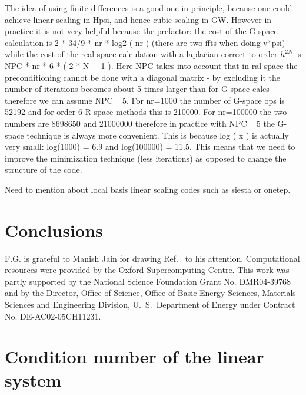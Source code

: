\documentclass[twocolumn,prb,showpacs,superscriptaddress]{revtex4}
\def\w{\omega}
\def\r{{\bf r}}
\def\rp{{\bf r^\prime}}
\begin{document}
The idea of using finite differences is a good one in principle,
because one could achieve linear scaling in Hpsi, and hence cubic scaling in GW.
However in practice it is not very helpful because the prefactor:
the cost of the G-space calculation is 2 * 34/9 * nr * log2 ( nr )   
(there are two ffts when doing v*psi) while the cost of the real-space 
calculation with a laplacian correct to order $h^{2N}$ is NPC * nr * 6 * ( 2 * N + 1 ).
Here NPC takes into account that in ral space the preconditioning
cannot be done with a diagonal matrix - by excluding it the number
of iterations becomes about 5 times larger than for G-space calcs -
therefore we can assume NPC ~ 5.
For nr=1000 the number of G-space ops is 52192 and for order-6 R-space methods
this is 210000. For nr=100000 the two numbers are 8698650 and 21000000
therefore in practice with NPC ~ 5 the G-space technique is always more convenient.
This is because log ( x ) is actually very small: log(1000) = 6.9 and log(100000) = 11.5.
This means that we need to improve the minimization technique (less iterations)
as opposed to change the structure of the code.

Need to mention about local basis linear scaling codes such as siesta or onetep.

\section{Conclusions}\label{sec.conclusions}



\begin{acknowledgments}
F.G. is grateful to Manish Jain for drawing Ref.\  to his attention.
Computational resources were provided by the Oxford Supercomputing Centre.
This work was partly supported by the National Science Foundation Grant No. DMR04-39768 and by
the Director, Office of Science, Office of Basic Energy Sciences, Materials Sciences
and Engineering Division, U.\ S.\ Department of Energy under Contract No. DE-AC02-05CH11231.
\end{acknowledgments}

\appendix

\section{Condition number of the linear system}\label{app.condition}
\end{document}
